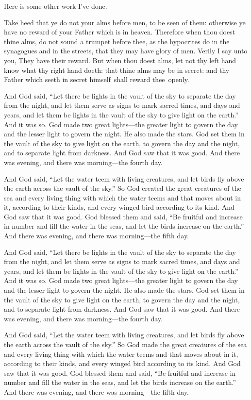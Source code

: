 \documentclass{grattanAlpha}
\begin{document}
Here is some other work I've done.

Take heed that ye do not your alms before men, to be seen of them: otherwise ye have no reward of your Father which is in heaven.
Therefore when thou doest thine alms, do not sound a trumpet before thee, as the hypocrites do in the synagogues and in the streets, that they may have glory of men.
Verily I say unto you, They have their reward.  
But when thou doest alms, let not thy left hand know what thy right hand doeth: that thine alms may be in secret: and thy Father which seeth in secret himself~shall reward thee~openly.

And God said, “Let there be lights in the vault of the sky to separate the day from the night, and let them serve as signs to mark sacred times, and days and years, and let them be lights in the vault of the sky to give light on the earth.”
And it was so.
God made two great lights—the greater light to govern the day and the lesser light to govern the night.
He also made the stars.
God set them in the vault of the sky to give light on the earth, to govern the day and the night, and to separate light from darkness.
And God saw that it was good.
And there was evening, and there was morning—the fourth day.

And God said, “Let the water teem with living creatures, and let birds fly above the earth across the vault of the sky.”
So God created the great creatures of the sea and every living thing with which the water teems and that moves about in it, according to their kinds, and every winged bird according to its kind.
And God saw that it was good.
God blessed them and said, “Be fruitful and increase in number and fill the water in the seas, and let the birds increase on the earth.”
And there was evening, and there was morning—the fifth day.

And God said, “Let there be lights in the vault of the sky to separate the day from the night, and let them serve as signs to mark sacred times, and days and years, and let them be lights in the vault of the sky to give light on the earth.”
And it was so.
God made two great lights—the greater light to govern the day and the lesser light to govern the night.
He also made the stars.
God set them in the vault of the sky to give light on the earth, to govern the day and the night, and to separate light from darkness.
And God saw that it was good.
And there was evening, and there was morning—the fourth day.

And God said, “Let the water teem with living creatures, and let birds fly above the earth across the vault of the sky.”
So God made the great creatures of the sea and every living thing with which the water teems and that moves about in it, according to their kinds, and every winged bird according to its kind.
And God saw that it was good.
God blessed them and said, “Be fruitful and increase in number and fill the water in the seas, and let the birds increase on the earth.”
And there was evening, and there was morning—the fifth day.
\end{document}
